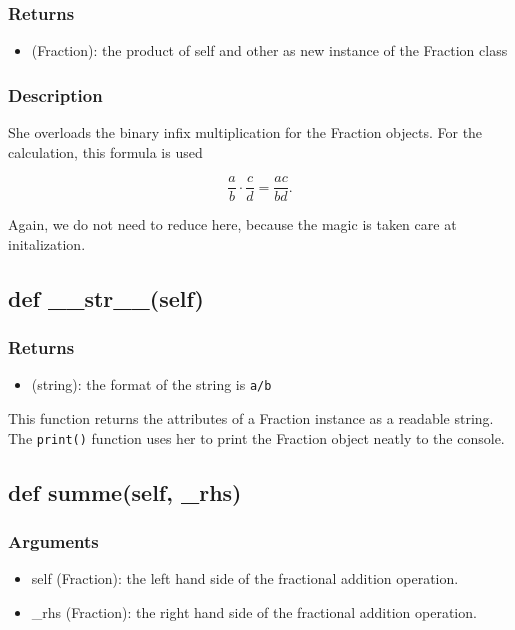 \documentclass[refman]{scrartcl}
\begin{document}
\subsubsection*{Returns}

\begin{itemize}
	\item (Fraction): the product of self and other as new instance of the Fraction class
\end{itemize}

\subsubsection*{Description}

She overloads the binary infix multiplication for the Fraction objects. For the calculation, this formula is used

\begin{equation}
	\frac{a}{b} \cdot \frac{c}{d} = \frac{ac}{bd} \text{.}
\end{equation}

Again, we do not need to reduce here, because the magic is taken care at initalization.

\subsection{def \_\_str\_\_(self)}

\subsubsection*{Returns}

\begin{itemize}
	\item (string): the format of the string is \texttt{a/b}
\end{itemize}

This function returns the attributes of a Fraction instance as a readable string. The \texttt{print()} function uses her to print the Fraction object neatly to the console.

\subsection{def summe(self, \_rhs)}

\subsubsection*{Arguments}
\begin{itemize}
	\item self (Fraction): the left hand side of the fractional addition operation.
	\item \_rhs (Fraction): the right hand side of the fractional addition operation.
\end{itemize}
\end{document}
